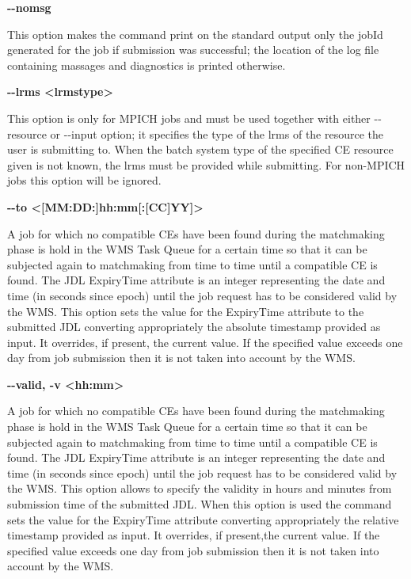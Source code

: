 \textbf{-{}-nomsg}

This option makes the command print on the standard output only the jobId generated for the job if submission was successful; the location of the log file containing massages and diagnostics is printed otherwise.




\textbf{-{}-lrms <lrmstype>}

This option is only for MPICH  jobs and must be used together with either -{}-resource or -{}-input option; it specifies the type of the lrms of the resource the user is submitting to. When the batch system type of the specified CE resource given is not known, the lrms must be provided while submitting. For non-MPICH jobs this option will be ignored.




\textbf{-{}-to <[MM:DD:]hh:mm[:[CC]YY]>}

A job for which no compatible CEs have been found during the matchmaking phase is hold in the WMS Task Queue for a certain time so that it can be subjected again to matchmaking from time to time until a compatible CE is found. The JDL ExpiryTime attribute is an integer representing the date and time (in seconds since epoch) until the job request has to be considered valid by the WMS. This option sets the value for the ExpiryTime attribute to the submitted JDL converting appropriately the absolute timestamp provided as input. It overrides, if present, the current value. If the specified value exceeds one day from job submission then it is not taken into account by the WMS.




\textbf{-{}-valid, -v <hh:mm>}

A job for which no compatible CEs have been found during the matchmaking phase is hold in the WMS Task Queue for a certain time so that it can be subjected again to matchmaking from time to time until a compatible CE is found. The JDL ExpiryTime attribute is an integer representing the date and time (in seconds since epoch) until the job request has to be considered valid by the WMS. This option allows to specify the validity in hours and minutes from submission time of the submitted JDL. When this option is used the command sets the value for the ExpiryTime attribute converting appropriately the relative timestamp provided as input. It overrides, if present,the current value. If the specified value exceeds one day from job submission then it is not taken into account by the WMS.




